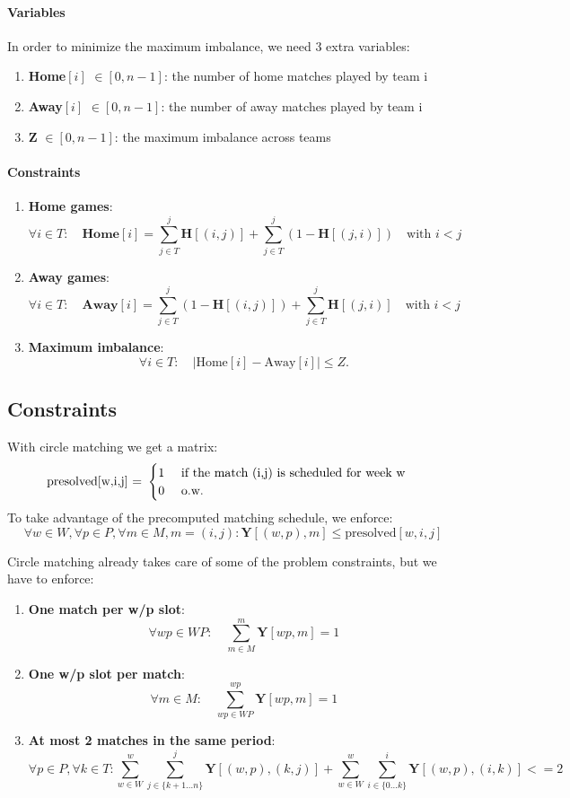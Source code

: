 \paragraph{Variables}
In order to minimize the maximum imbalance, we need 3 extra variables:
\begin{enumerate}
\item \textbf{Home}$[i]$ $\in [0,n-1]$: the number of home matches played by team i
\item \textbf{Away}$[i]$ $\in [0,n-1]$: the number of away matches played by team i
\item \textbf{Z} $ \in [0,n-1]$: the maximum imbalance across teams
\end{enumerate}

\paragraph{Constraints}
\begin{enumerate}
    \item \textbf{Home games}: 
\[\forall i \in T: \quad \textbf{Home}[i] = \sum_{j \in T}^{j} \textbf{H}[(i,j)] + \sum_{j \in T}^{j} (1- \textbf{H}[(j,i)]) \quad \text{with $i < j$}\]
    \item \textbf{Away games}: 
\[\forall i \in T: \quad \textbf{Away}[i] = \sum_{j \in T}^{j} (1- \textbf{H}[(i,j)]) + \sum_{j \in T}^{j} \textbf{H}[(j,i)] \quad \text{with $i < j$}\]
    \item \textbf{Maximum imbalance}: 
\[
\forall i \in T: \quad |\text{Home}[i] - \text{Away}[i]| \leq Z.
\]
\end{enumerate}

\subsection{Constraints}
With circle matching we get a matrix:
\[
\text{presolved[w,i,j] = }
\begin{cases}
    \text{1 \quad if the match (i,j) is scheduled for week w}\\
    \text{0 \quad o.w.}
\end{cases}
\]
To take advantage of the precomputed matching schedule, we enforce:
\[\forall w \in W, \forall p \in P, \forall m \in M, m = (i,j): \textbf{Y}[(w,p),m] \leq \text{presolved}[w,i,j]\]

Circle matching already takes care of some of the problem constraints, but we have to enforce:
\begin{enumerate}
\item \textbf{One match per w/p slot}: 
\[\forall wp \in WP: \quad\sum_{m \in M}^{m} \textbf{Y}[wp, m] = 1\]
\item \textbf{One w/p slot per match}: 
\[\forall m \in M: \quad\sum_{wp \in WP}^{wp} \textbf{Y}[wp, m] = 1\]
\item \textbf{At most 2 matches in the same period}: 
\[
\forall p \in P, \forall k \in T:
\sum_{w \in W}^{w}\sum_{j \in \{k+1\dots n\}}^{j} \textbf{Y}[(w,p), (k,j)] + 
\sum_{w \in W}^{w}\sum_{i \in \{0\dots k\}}^{i} \textbf{Y}[(w,p), (i,k)] <= 2
\]
\end{enumerate}

